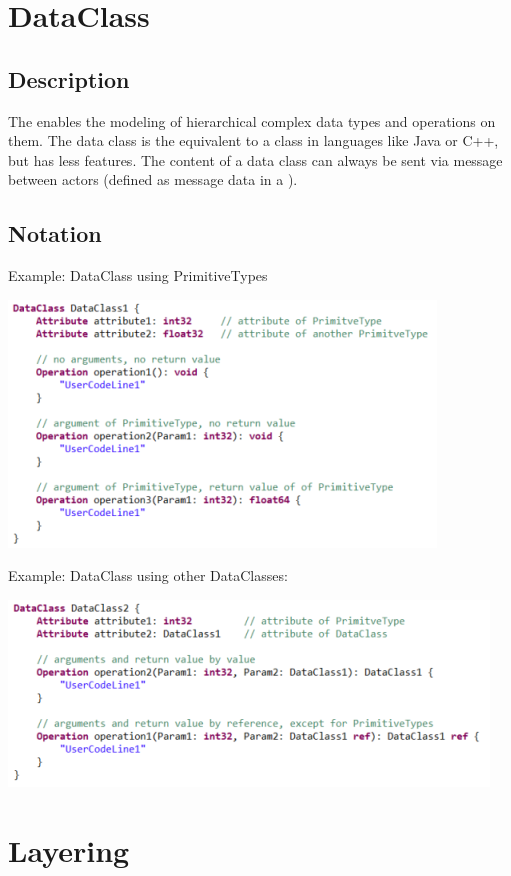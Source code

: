 \section{DataClass}

\subsection{Description}

The  enables the modeling of hierarchical complex data types and operations on them.
The data class is the equivalent to a class in languages like Java or C++, but has less features. The content of a 
data class can always be sent via message between actors (defined as message data in a ).

\subsection{Notation}
  
Example: DataClass using PrimitiveTypes

\includegraphics{images/040-DataClass1.png}

Example: DataClass using other DataClasses:

\includegraphics{images/040-DataClass2.png}

\section{Layering}

